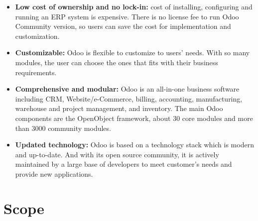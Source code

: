 \begin{itemize}
	\item \textbf{Low cost of ownership and no lock-in:} cost of installing, configuring and running an ERP
system is expensive. There is no license fee to run Odoo Community version, so users can
save the cost for implementation and customization. 
	\item \textbf{Customizable:} Odoo is flexible to customize to users’ needs. With so many modules, the
user can choose the ones that fits with their business requirements.
	\item \textbf{Comprehensive and modular:} Odoo is an all-in-one business software including CRM,
Website/e-Commerce, billing, accounting, manufacturing, warehouse and project
management, and inventory. The main Odoo components are the OpenObject framework,
about 30 core modules and more than 3000 community modules.
	\item \textbf{Updated technology:} Odoo is based on a technology stack which is modern and up-to-date.
And with its open source community, it is actively maintained by a large base of developers
to meet customer’s needs and provide new applications.
\end{itemize}

\section{Scope}

